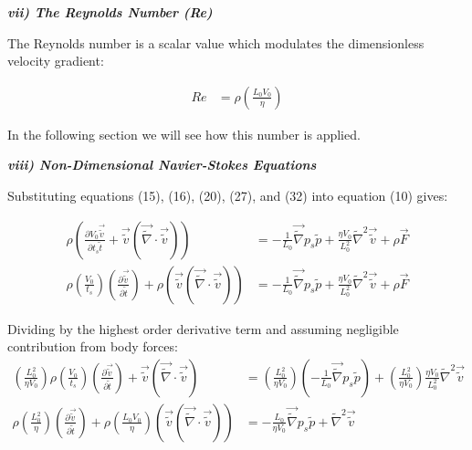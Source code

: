 \documentclass[titlepage]{article}
\begin{document}
    \begin{center}
        \textbf{\emph{vii) The Reynolds Number (Re)}}
    \end{center}

    \noindent The Reynolds number is a scalar value which modulates the dimensionless velocity gradient: 

    \begin{align}
        Re &= \rho\left(\displaystyle\frac{L_{0}V_{0}}{\eta}\right)
    \end{align}

    \noindent In the following section we will see how this number is applied.

    \newpage
    \begin{center}
        \textbf{\emph{viii) Non-Dimensional Navier-Stokes Equations}}
    \end{center}

    \noindent Substituting equations (15), (16), (20), (27), and (32) into equation (10) gives: 

    \begin{align}
        \rho\left(
            \displaystyle\frac{\partial{V_{0}\vec{\tilde{v}}}}{\partial{t_{s}\tilde{t}}}+\vec{\tilde{v}}\left(\vec{\tilde{\nabla}}\cdot\vec{\tilde{v}}\right)
        \right) 
        &= -\displaystyle\frac{1}{L_{0}}\vec{\tilde{\nabla}}p_{s}\tilde{p} + \displaystyle\frac{\eta{V_{0}}}{L_{0}^2}\tilde{\nabla}^2\vec{\tilde{v}} + \rho\vec{F} \\
        \rho\left(
            \displaystyle\frac{V_{0}}{t_{s}} 
            \right)\left(\displaystyle\frac{\partial{\vec{\tilde{v}}}}{\partial{\tilde{t}}}\right) + \rho\left(\vec{\tilde{v}}\left(\vec{\tilde{\nabla}}\cdot\vec{\tilde{v}}\right)
        \right)
        &= -\displaystyle\frac{1}{L_{0}}\vec{\tilde{\nabla}}p_{s}\tilde{p} + \displaystyle\frac{{\eta}{V_{0}}}{L_{0}^2}\tilde{\nabla}^2\vec{\tilde{v}} + \rho\vec{F}
    \end{align}

    \noindent Dividing by the highest order derivative term and assuming negligible contribution from body forces: 
    \begin{align}
        \left(
            \displaystyle\frac{L_{0}^2}{\eta{V_{0}}}
        \right)
        \rho\left(
            \displaystyle\frac{V_{0}}{t_{s}} 
            \right)\left(\displaystyle\frac{\partial{\vec{\tilde{v}}}}{\partial{\tilde{t}}}\right) + \vec{\tilde{v}}\left(\vec{\tilde{\nabla}}\cdot\vec{\tilde{v}}\right)
        &= \left(\displaystyle\frac{L_{0}^2}{\eta{V_{0}}}\right)\left(-\displaystyle\frac{1}{L_{0}}\vec{\tilde{\nabla}}p_{s}\tilde{p}\right) + \left(
            \displaystyle\frac{L_{0}^2}{\eta{V_{0}}}
        \right) \displaystyle\frac{{\eta}{V_{0}}}{L_{0}^2}\tilde{\nabla}^2\vec{\tilde{v}}  \\
        \rho\left(\displaystyle\frac{L_{0}^2}{\eta}\right)\left(\displaystyle\frac{\partial{\vec{\tilde{v}}}}{\partial{\tilde{t}}}\right) + \rho\left(\displaystyle\frac{L_{0}V_{0}}{\eta}\right)\left(\vec{\tilde{v}}\left(\vec{\tilde{\nabla}}\cdot\vec{\tilde{v}}\right)\right) &= -\displaystyle\frac{L_{0}}{\eta{V_{0}}}\vec{\tilde{\nabla}}p_{s}\tilde{p} + \tilde{\nabla}^2\vec{\tilde{v}}
    \end{align}
\end{document}
